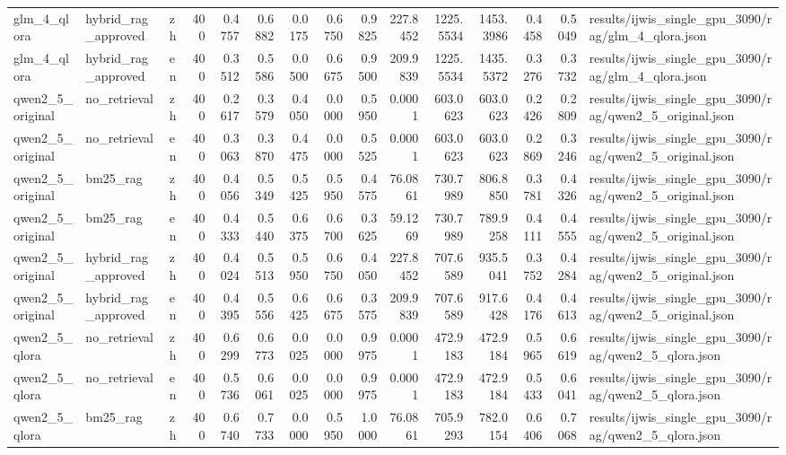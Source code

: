 \begin{tabular}{lllrrrrrrrrrrrl}
glm_4_qlora & hybrid_rag_approved & zh & 400 & 0.4757 & 0.6882 & 0.0175 & 0.6750 & 0.9825 & 227.8452 & 1225.5534 & 1453.3986 & 0.4458 & 0.5049 & results/ijwis_single_gpu_3090/rag/glm_4_qlora.json \\
glm_4_qlora & hybrid_rag_approved & en & 400 & 0.3512 & 0.5586 & 0.0500 & 0.6675 & 0.9500 & 209.9839 & 1225.5534 & 1435.5372 & 0.3276 & 0.3732 & results/ijwis_single_gpu_3090/rag/glm_4_qlora.json \\
qwen2_5_original & no_retrieval & zh & 400 & 0.2617 & 0.3579 & 0.4050 & 0.0000 & 0.5950 & 0.0001 & 603.0623 & 603.0623 & 0.2426 & 0.2809 & results/ijwis_single_gpu_3090/rag/qwen2_5_original.json \\
qwen2_5_original & no_retrieval & en & 400 & 0.3063 & 0.3870 & 0.4475 & 0.0000 & 0.5525 & 0.0001 & 603.0623 & 603.0623 & 0.2869 & 0.3246 & results/ijwis_single_gpu_3090/rag/qwen2_5_original.json \\
qwen2_5_original & bm25_rag & zh & 400 & 0.4056 & 0.5349 & 0.5425 & 0.5950 & 0.4575 & 76.0861 & 730.7989 & 806.8850 & 0.3781 & 0.4326 & results/ijwis_single_gpu_3090/rag/qwen2_5_original.json \\
qwen2_5_original & bm25_rag & en & 400 & 0.4333 & 0.5440 & 0.6375 & 0.6700 & 0.3625 & 59.1269 & 730.7989 & 789.9258 & 0.4111 & 0.4555 & results/ijwis_single_gpu_3090/rag/qwen2_5_original.json \\
qwen2_5_original & hybrid_rag_approved & zh & 400 & 0.4024 & 0.5513 & 0.5950 & 0.6750 & 0.4050 & 227.8452 & 707.6589 & 935.5041 & 0.3752 & 0.4284 & results/ijwis_single_gpu_3090/rag/qwen2_5_original.json \\
qwen2_5_original & hybrid_rag_approved & en & 400 & 0.4395 & 0.5556 & 0.6425 & 0.6675 & 0.3575 & 209.9839 & 707.6589 & 917.6428 & 0.4176 & 0.4613 & results/ijwis_single_gpu_3090/rag/qwen2_5_original.json \\
qwen2_5_qlora & no_retrieval & zh & 400 & 0.6299 & 0.6773 & 0.0025 & 0.0000 & 0.9975 & 0.0001 & 472.9183 & 472.9184 & 0.5965 & 0.6619 & results/ijwis_single_gpu_3090/rag/qwen2_5_qlora.json \\
qwen2_5_qlora & no_retrieval & en & 400 & 0.5736 & 0.6061 & 0.0025 & 0.0000 & 0.9975 & 0.0001 & 472.9183 & 472.9184 & 0.5433 & 0.6041 & results/ijwis_single_gpu_3090/rag/qwen2_5_qlora.json \\
qwen2_5_qlora & bm25_rag & zh & 400 & 0.6740 & 0.7733 & 0.0000 & 0.5950 & 1.0000 & 76.0861 & 705.9293 & 782.0154 & 0.6406 & 0.7068 & results/ijwis_single_gpu_3090/rag/qwen2_5_qlora.json \\

\end{tabular}
